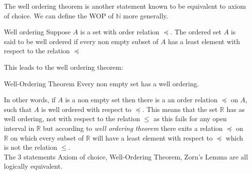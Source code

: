 \documentclass[16pt,a4paper]{article}
\theoremstyle{definition}
\begin{document}
\newpage
The well ordering theorem is another statement known to be equivalent to axiom of choice. We can define the WOP of $\mathbb{N}$ more generally. 
\begin{defn}{Well ordering}{}
Suppose $A$ is a set with order relation $\preceq$. The ordered set $A$ is said to be well ordered if every non empty subset of $A$ has a least element with respect to the relation $\preceq$
\end{defn}

This leads to the well ordering theorem:

\begin{thm}{Well-Ordering Theorem}{}
Every non empty set has a well ordering. 
\end{thm}

In other words, if $A$ is a non empty set then there is a an order relation $\preceq$ on $A$, such that $A$ is well ordered with respect to $\preceq$. This means that the set $\mathbb{R}$ has as well ordering, not with respect to the relation $\leq$ as this fails for any open interval in $\mathbb{R}$ but according to \textit{well ordering theorem} there exits a relation $\preceq$ on $\mathbb{R}$ on which every subset of $\mathbb{R}$ will have a least element with respect to $\preceq$ which is not the relation $\leq$. 
\\

The 3 statements Axiom of choice, Well-Ordering Theorem, Zorn's Lemma are all logically equivalent.    
\end{document}
